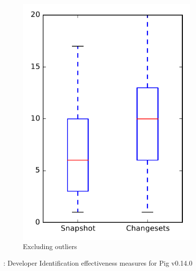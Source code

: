 \begin{figure}
\begin{subfigure}{.4\textwidth}
        \includegraphics[height=0.4\textheight]{figures/dit/rq1_pig_no_outlier}
        \caption{Excluding outliers}\label{fig:dit:rq1:pig_no_outlier}
    \end{subfigure}
\caption{\done: Developer Identification effectiveness measures for Pig v0.14.0}
\label{fig:dit:rq1:pig}
\end{figure}
